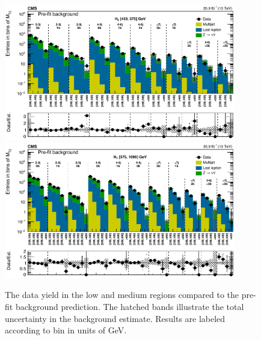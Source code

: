\begin{figure}
	\centering
	\includegraphics[width=0.90\textwidth]{results/figs/mt2_lowHT_fullEstimate}
	\includegraphics[width=0.90\textwidth]{results/figs/mt2_mediumHT_fullEstimate}
	\renewcommand{\baselinestretch}{1.0}
	\caption[The data yield in the low \HT and medium \HT regions compared to the pre-fit background prediction.]{The data yield in the low \HT and medium \HT regions compared to the pre-fit background prediction. The hatched bands illustrate the total uncertainty in the background estimate. Results are labeled according to \mttwo bin in units of GeV.}
	\label{fig:yieldPrefit2}
\end{figure}
